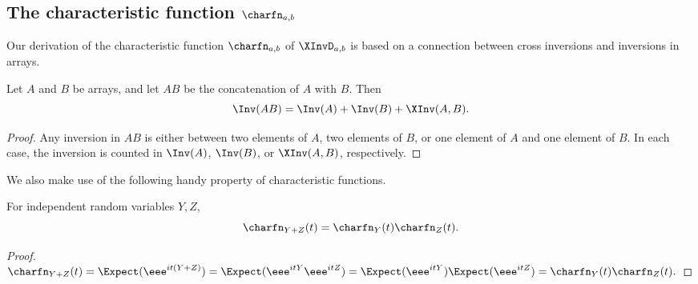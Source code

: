 \documentclass{toc}
\begin{document}
\subsection{The characteristic function \texorpdfstring{$\charfn_{a,b}$}{phi a,b}}
\label{sec:characteristic}

Our derivation of the characteristic function $\charfn_{a,b}$ of $\XInvD_{a,b}$ is based on a connection between cross inversions and inversions in arrays.
\begin{fact}
    \label{fact:cross-inversion-property}
    Let $A$ and $B$ be arrays, and let $AB$ be the concatenation of $A$ with $B$. Then
    \[\Inv(AB)=\Inv(A)+\Inv(B)+\XInv(A,B). \]
\end{fact}
\begin{proof}
    Any inversion in $AB$ is either between two elements of $A$, two elements of $B$, or one element of $A$ and one element of $B$. In each case, the inversion is counted in $\Inv(A)$, $\Inv(B)$, or $\XInv(A,B)$, respectively.
\end{proof}

We also make use of the following handy property of characteristic functions.
\begin{fact}
    \label{fact:charfn-mult}
    For independent random variables $Y,Z$,
    \[\charfn_{Y+Z}(t)=\charfn_Y(t)\charfn_Z(t). \]
\end{fact}
\begin{proof}
%
\quad
$ \charfn_{Y+Z}(t)=\Expect(\eee^{it(Y+Z)})=\Expect(\eee^{itY}\eee^{itZ})=\Expect(\eee^{itY})\Expect(\eee^{itZ})=\charfn_Y(t)\charfn_Z(t). $   %
\end{proof}
%
\end{document}
